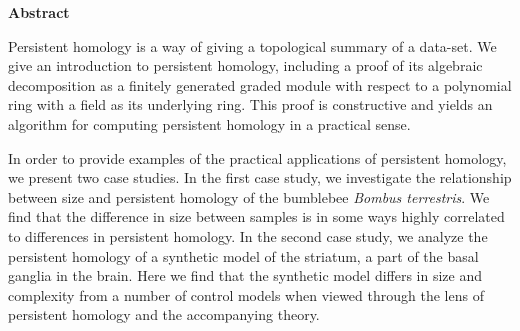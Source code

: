 \newenvironment{abstract}%
    {\cleardoublepage\thispagestyle{empty}\null\vfill\begin{center}%
    \bfseries Abstract \end{center}}%
    {\vfill\null}
        \begin{abstract}
          Persistent homology is a way of giving a topological summary of a data-set. We give an introduction to   persistent homology, including a proof of its algebraic decomposition as a finitely generated graded module with respect to a polynomial ring with a field as its underlying ring. This proof is constructive and yields an algorithm for computing persistent homology in a practical sense.

          In order to provide examples of the practical applications of persistent homology, we present two case studies. In the first case study, we investigate the relationship between size and persistent homology of the bumblebee \textit{Bombus terrestris}. We find that the difference in size between samples is in some ways highly correlated to differences in persistent homology. In the second case study, we analyze the persistent homology of a synthetic model of the striatum, a part of the basal ganglia in the brain. Here we find that the synthetic model differs in size and complexity from a number of control models when viewed through the lens of persistent homology and the accompanying theory. \end{abstract}
